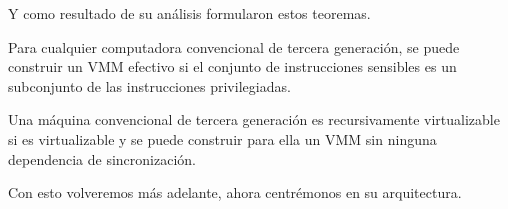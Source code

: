 \noindent Y como resultado de su análisis formularon estos teoremas.
\begin{teorema}
Para cualquier computadora convencional de tercera generación, se puede construir un VMM efectivo si el conjunto de instrucciones sensibles es un subconjunto de las instrucciones privilegiadas.
\end{teorema}
\begin{teorema}
Una máquina convencional de tercera generación es recursivamente virtualizable si es virtualizable y se puede construir para ella un VMM sin ninguna dependencia de sincronización.
\end{teorema}
\noindent Con esto volveremos más adelante, ahora centrémonos en su arquitectura.